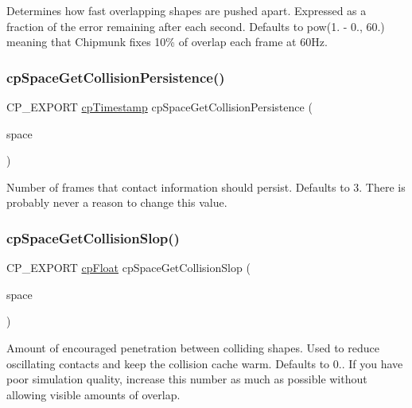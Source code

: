 Determines how fast overlapping shapes are pushed apart. Expressed as a fraction of the error remaining after each second. Defaults to pow(1. -\/ 0., 60.) meaning that Chipmunk fixes 10\% of overlap each frame at 60\+Hz. \mbox{\label{group__cp_space_gac20dad9f3ef05f468773db3d7667c9ba}} 
\subsubsection{\texorpdfstring{cp\+Space\+Get\+Collision\+Persistence()}{cpSpaceGetCollisionPersistence()}}
{\footnotesize\ttfamily C\+P\+\_\+\+E\+X\+P\+O\+RT \mbox{\hyperlink{group__basic_types_gaa24652c104082d0725066ea5ac7dc83f}{cp\+Timestamp}} cp\+Space\+Get\+Collision\+Persistence (\begin{DoxyParamCaption}\item[{const \mbox{\hyperlink{structcp_space}{cp\+Space}} $\ast$}]{space }\end{DoxyParamCaption})}

Number of frames that contact information should persist. Defaults to 3. There is probably never a reason to change this value. \mbox{\label{group__cp_space_ga7b5e6178a021b1b6bba4b70876bf79d0}} 
\subsubsection{\texorpdfstring{cp\+Space\+Get\+Collision\+Slop()}{cpSpaceGetCollisionSlop()}}
{\footnotesize\ttfamily C\+P\+\_\+\+E\+X\+P\+O\+RT \mbox{\hyperlink{group__basic_types_gac1ed65573e035bf892505768c852d8d3}{cp\+Float}} cp\+Space\+Get\+Collision\+Slop (\begin{DoxyParamCaption}\item[{const \mbox{\hyperlink{structcp_space}{cp\+Space}} $\ast$}]{space }\end{DoxyParamCaption})}

Amount of encouraged penetration between colliding shapes. Used to reduce oscillating contacts and keep the collision cache warm. Defaults to 0.. If you have poor simulation quality, increase this number as much as possible without allowing visible amounts of overlap. \mbox{\label{group__cp_space_gad4819cd09e4590b60eea6b6dc8b4cf80}} 
